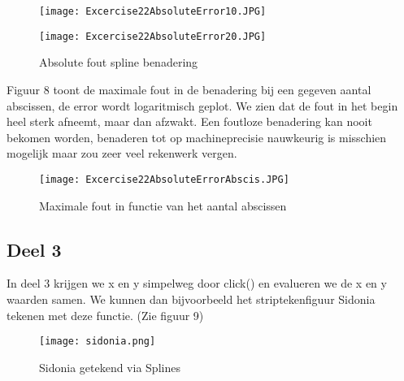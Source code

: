 \documentclass[a4paper]{article}
\begin{document}
\begin{figure}
\caption{Absolute fout spline benadering}
	\begin{minipage}{.5\textwidth}
		\centering
		\texttt{[image: Excercise22AbsoluteError10.JPG]}
	\end{minipage}
	\begin{minipage}{.5\textwidth}
		\centering
		\texttt{[image: Excercise22AbsoluteError20.JPG]}
	\end{minipage}
\end{figure}
Figuur 8 toont de maximale fout in de benadering bij een gegeven aantal abscissen, de error wordt logaritmisch geplot.
We zien dat de fout in het begin heel sterk afneemt, maar dan afzwakt. Een foutloze benadering  kan nooit bekomen worden, benaderen tot op machineprecisie nauwkeurig is misschien mogelijk maar zou zeer veel rekenwerk vergen.
\begin{figure}
\caption{Maximale fout in functie van het aantal abscissen}
\texttt{[image: Excercise22AbsoluteErrorAbscis.JPG]}
\end{figure}

\subsection{Deel 3}
In deel 3 krijgen we x en y simpelweg door click() en evalueren we de x en y waarden samen. We kunnen dan bijvoorbeeld het striptekenfiguur Sidonia tekenen met deze functie. (Zie figuur 9)

\begin{figure}
\caption{Sidonia getekend via Splines}
\texttt{[image: sidonia.png]}
\end{figure}
\end{document}
